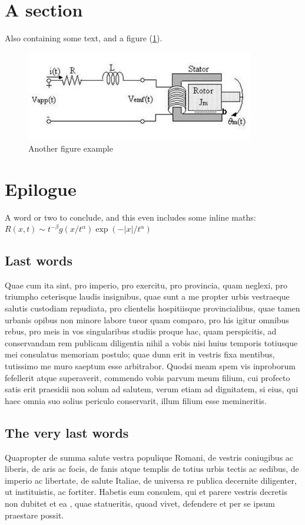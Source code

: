 \documentclass[a4paper,12pt,twoside,swedish]{report}
\begin{document}
\section{A section}
Also containing some text, and a figure (\ref{fig:plot_result}).
\begin{figure}
 \begin{center}
   \includegraphics[width=10cm]{Figures/dcmotor.jpg}  
  \end{center}
\caption{Another figure example}
   \label{fig:plot_result}
\end{figure}

\section{Epilogue}
A word or two to conclude,  and this even includes some
inline maths: \(R(x,t)\sim
t^{-\beta}g(x/t^\alpha)\exp(-|x|/t^\alpha)\)

\subsection{Last words}
 Quae cum ita sint, pro imperio, pro exercitu, pro provincia, quam
neglexi, pro triumpho ceterisque laudis insignibus, quae sunt a me
propter urbis vestraeque salutis custodiam repudiata, pro clientelis
hospitiisque provincialibus, quae tamen urbanis opibus non minore labore
tueor quam comparo, pro his igitur omnibus rebus, pro meis in vos
singularibus studiis proque hac, quam perspicitis, ad conservandam rem
publicam diligentia nihil a vobis nisi huius temporis totiusque mei
consulatus memoriam postulo; quae dunn erit in vestris fixa mentibus,
tutissimo me muro saeptum esse arbitrabor. Quodsi meam spem vis
inproborum fefellerit atque superaverit, commendo vobis parvum meum
filium, cui profecto satis erit praesidii non solum ad salutem, verum
etiam ad dignitatem, si eius, qui haec omnia suo solius periculo
conservarit, illum filium esse memineritis.

\subsection{The very last words}
Quapropter de summa salute
vestra populique Romani, de vestris coniugibus ac liberis, de aris ac
focis, de fanis atque templis de totius urbis tectis ac sedibus, de
imperio ac libertate, de salute Italiae, de universa re publica
decernite diligenter, ut instituistis, ac fortiter. Habetis eum
consulem, qui et parere vestris decretis non dubitet et ea \cite{fortran}, quae
statueritis, quoad vivet, defendere et per se ipsum praestare possit.
\end{document}
